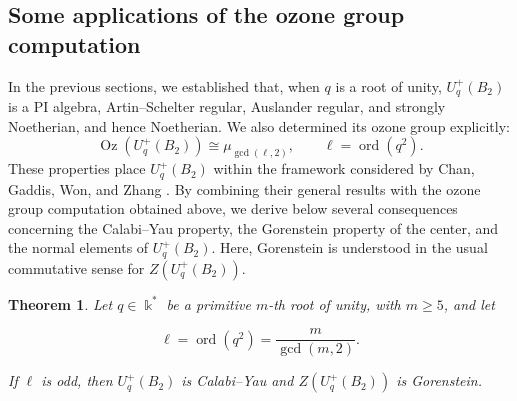 \documentclass[11pt]{article}
\newtheorem{theorem}{Theorem}[section]
\theoremstyle{definition}
\newcommand{\K}{\Bbbk}
\begin{document}
\subsection{Some applications of the ozone group computation}
In the previous sections, we established that, when \(q\) is a root of
unity, \(U_q^{+}(B_2)\) is a PI algebra, Artin--Schelter regular, Auslander regular, and
strongly Noetherian, and hence Noetherian. We also determined its ozone
group explicitly:
$$
\operatorname{Oz}(U_q^{+}(B_2))
\cong \mu_{\gcd(\ell,2)},
\qquad \ell=\operatorname{ord}(q^2).
$$
These properties place \(U_q^{+}(B_2)\) within the framework considered
by Chan, Gaddis, Won, and Zhang \cite{ChanGaddisWonZhang2025}. By combining
their general results with the ozone group computation obtained above,
we derive below several consequences concerning the Calabi--Yau property,
the Gorenstein property of the center, and the normal elements of
\(U_q^{+}(B_2)\).  Here, Gorenstein is understood in the usual commutative sense for \(Z(U_q^{+}(B_2))\).

\begin{theorem}
\label{teo:UqB2-center-Gorenstein}
Let \(q\in\K^*\) be a primitive \(m\)-th root of unity, with
\(m\geq5\), and let

$$
\ell=\operatorname{ord}(q^2)=\frac{m}{\gcd(m,2)}.
$$

If \(\ell\) is odd, then \(U_q^{+}(B_2)\) is Calabi--Yau and
\(Z(U_q^{+}(B_2))\) is Gorenstein.
\end{theorem}
\end{document}
